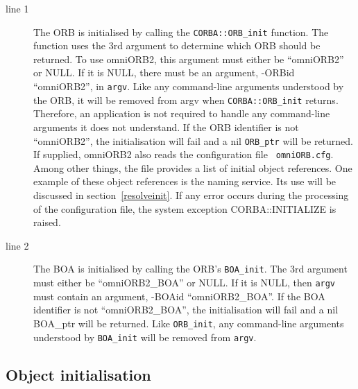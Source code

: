 \documentclass[11pt,twoside,onecolumn]{book}
\begin{document}
\begin{description}

\item[line 1] The ORB is initialised by calling the {\tt CORBA::ORB\_init} function. The function uses the 3rd argument to determine which ORB should be
returned. To use omniORB2, this argument must either be ``omniORB2'' or
NULL. If it is NULL, there must be an argument, -ORBid ``omniORB2'', in
{\tt argv}. Like any command-line arguments understood by the ORB, it will
be removed from argv when {\tt CORBA::ORB\_init} returns. Therefore, an
application is not required to handle any command-line arguments it does
not understand. If the ORB identifier is not ``omniORB2'', the
initialisation will fail and a nil {\tt ORB\_ptr} will be returned. If
supplied, omniORB2 also reads the configuration file {\tt
omniORB.cfg}. Among other things, the file provides a list of initial
object references. One example of these object references is the naming
service. Its use will be discussed in section~\ref{resolveinit}. If any
error occurs during the processing of the configuration file, the system
exception CORBA::INITIALIZE is raised.


\item[line 2] The BOA is initialised by calling the ORB's {\tt BOA\_init}.
The 3rd argument must either be ``omniORB2\_BOA'' or NULL. If it
is NULL, then {\tt argv} must contain an argument, -BOAid
``omniORB2\_BOA''. If the BOA identifier is not ``omniORB2\_BOA'', the
initialisation will fail and a nil BOA\_ptr will be returned. Like
{\tt ORB\_init}, any command-line arguments understood by {\tt BOA\_init}
will be removed from {\tt argv}.

\end{description}

\subsection{Object initialisation}
\end{document}
